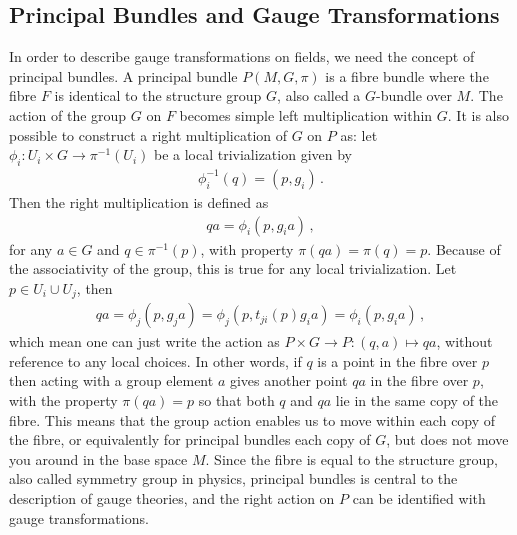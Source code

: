 \subsection*{Principal Bundles and Gauge Transformations}
In order to describe gauge transformations on fields, we need the concept of principal bundles. A principal bundle $P(M,G,\pi)$ is a fibre bundle where the fibre $F$ is identical to the structure group $G$, also called a $G$-bundle over $M$. The action of the group $G$ on $F$ becomes simple left multiplication within $G$. It is also possible to construct a right multiplication of $G$ on $P$ as: let $\phi_{i}:U_{i}\times G\rightarrow \pi^{-1}(U_{i})$ be a local trivialization given by
\begin{align}
    \phi_{i}^{-1}(q)=(p,g_i)\,.
\end{align}
Then the right multiplication is defined as
\begin{align}
    qa=\phi_{i}(p,g_{i}a)\,,
\end{align}
for any $a\in G$ and $q\in \pi^{-1}(p)$, with property $\pi(qa)=\pi(q)=p$. Because of the associativity of the group, this is true for any local trivialization. Let $p\in U_{i}\cup U_{j}$, then
\begin{align}
    qa=\phi_{j}(p,g_{j}a)=\phi_{j}(p,t_{ji}(p)g_{i}a)=\phi_{i}(p,g_{i}a)\,,
\end{align}
which mean one can just write the action as $P\times G\rightarrow P:(q,a)\mapsto qa$, without reference to any local choices. In other words, if $q$ is a point in the fibre over $p$ then acting with a group element $a$ gives another point $qa$ in the fibre over $p$, with the property $\pi(qa)=p$ so
that both $q$ and $qa$ lie in the same copy of the fibre. This means that the group action enables us to move within each copy of the fibre, or equivalently for principal bundles each copy of $G$, but does not move you around in the base space $M$. Since the fibre is equal to the structure group, also called symmetry group in physics, principal bundles is central to the description of gauge theories, and the right action on $P$ can be identified with gauge transformations. 

